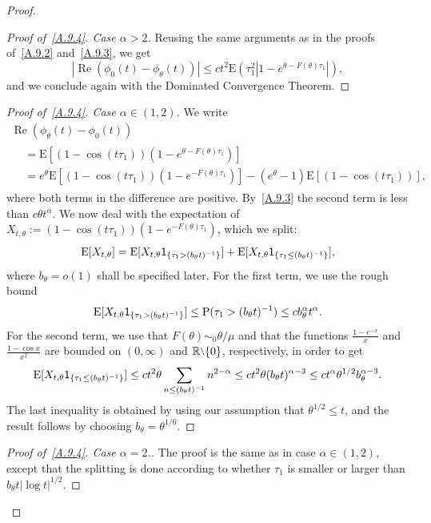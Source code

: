 \documentclass[AHL,Unicode,longabstracts]{cedram}
\DeclareMathOperator{\re}{Re}
\newcommand{\bbR}{{\ensuremath{\mathbb R}}}
\newcommand{\ga}{\alpha}
\newcommand{\gt}{\theta}
\newcommand\bP{\ensuremath{\mathrm{P}}}
\newcommand\bE{\ensuremath{\mathrm{E}}}
\newcommand{\ind}{{\sf 1}}
\newcommand{\sm}{{\raise0.3ex\hbox{$\scriptstyle \setminus$}}}
\newenvironment{step}[1]{\begin{proof}[#1]}{\let\qed\relax \end{proof}}
\newenvironment{laststep}[1]{\begin{proof}[#1]}{\end{proof}}
\begin{document}
\begin{proof}
\begin{step}{Proof of~\eqref{A.9.4}. Case $\ga >2$}
Reusing the same arguments as in the proofs of~\eqref{A.9.2} and~\eqref{A.9.3}, we get
\begin{equation}
| \re(\phi_0(t) -\phi_\gt(t)) | \le ct^2 \bE(\tau_1^2|1-e^{\gt - F(\gt)\tau_1}|),
\end{equation}
and we conclude again with the Dominated Convergence Theorem.
\end{step}

\begin{step}{Proof of~\eqref{A.9.4}. Case $\ga \in (1,2)$}
We write
\begin{multline}
\re (\phi_\gt(t) - \phi_0(t))\\
\begin{aligned}
&= \bE[(1-\cos(t\tau_1)) (1-e^{\gt -F(\gt)\tau_1})]\\
& = e^{\gt}\bE[(1-\cos(t\tau_1)) (1-e^{-F(\gt)\tau_1})] - (e^\gt - 1)\bE[(1-\cos(t\tau_1))],
\end{aligned}
\end{multline}
where both terms in the difference are positive. By~\eqref{A.9.3} the second term is less than $c\gt t^\ga$. We now deal with the expectation of $X_{t,\gt} := (1-\cos(t\tau_1)) (1-e^{-F(\gt)\tau_1})$, which we split:
\begin{equation}
\bE[X_{t,\gt}] = \bE[X_{t,\gt} \ind_{\{\tau_1 > (b_\gt t)^{-1}\}}] + \bE[X_{t,\gt} \ind_{\{\tau_1 \le (b_\gt t)^{-1}\}}],
\end{equation}
where $b_\gt = o(1)$ shall be specified later. For the first term, we use the rough bound
\begin{equation}
\bE[X_{t,\gt} \ind_{\{\tau_1 > (b_\gt t)^{-1}\}}] \le \bP(\tau_1 > (b_\gt t)^{-1}) \le c b_\gt^\ga t^\ga.
\end{equation}
For the second term, we use that $F(\theta)\sim_0 \gt/\mu$ and that the functions $\frac{1-e^{-x}}{x}$ and $\frac{1-\cos x}{x^2}$ are bounded on $(0,\infty)$ and $\bbR\sm\{0\}$, respectively, in order to get
\begin{equation}
\bE[X_{t,\gt} \ind_{\{\tau_1\le (b_\gt t)^{-1}\}}]
\le c t^2 \gt \sum_{n\le (b_\gt t)^{-1}} n^{2-\ga}
\le ct^2\gt (b_\gt t)^{\ga - 3} \le c t^\ga \gt^{1/2}b_\gt^{\ga-3}.
\end{equation}
The last inequality is obtained by using our assumption that $\gt^{1/2} \le t$, and the result follows by choosing $b_\gt = \gt^{1/6}$.
\end{step}

\begin{laststep}{Proof of~\eqref{A.9.4}. Case $\ga =2$.} The proof is the same as in case $\ga \in(1,2)$, except that the splitting is done according to whether $\tau_1$ is smaller or larger than $b_\gt t |{\log t}|^{1/2}$.
\end{laststep}
\let\qed\relax
\end{proof}
\end{document}
